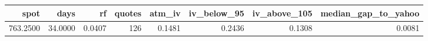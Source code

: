 \begin{tabular}{rrrrrrrr}
\toprule
spot & days & rf & quotes & atm_iv & iv_below_95 & iv_above_105 & median_gap_to_yahoo \\
\midrule
763.2500 & 34.0000 & 0.0407 & 126 & 0.1481 & 0.2436 & 0.1308 & 0.0081 \\
\bottomrule
\end{tabular}
